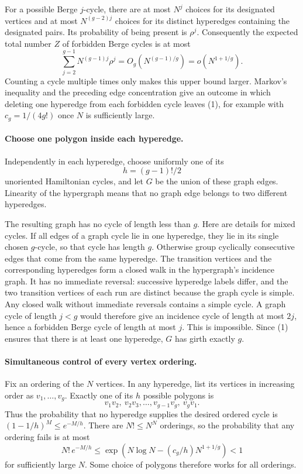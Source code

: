 For a possible Berge \(j\)-cycle, there are at most \(N^j\) choices for its designated vertices and at most \(N^{(g-2)j}\) choices for its distinct hyperedges containing the designated pairs. Its probability of being present is \(\rho^j\). Consequently the expected total number \(Z\) of forbidden Berge cycles is at most
\[
 \sum_{j=2}^{g-1}N^{(g-1)j}\rho^j
 =O_g(N^{(g-1)/g})=o(N^{1+1/g}).
\]
Counting a cycle multiple times only makes this upper bound larger. Markov's inequality and the preceding edge concentration give an outcome in which deleting one hyperedge from each forbidden cycle leaves (1), for example with \(c_g=1/(4g!)\) once \(N\) is sufficiently large.

\paragraph{Choose one polygon inside each hyperedge.}
Independently in each hyperedge, choose uniformly one of its
\[
 h=(g-1)!/2
\]
unoriented Hamiltonian cycles, and let \(G\) be the union of these graph edges. Linearity of the hypergraph means that no graph edge belongs to two different hyperedges.

The resulting graph has no cycle of length less than \(g\). Here are details for mixed cycles. If all edges of a graph cycle lie in one hyperedge, they lie in its single chosen \(g\)-cycle, so that cycle has length \(g\). Otherwise group cyclically consecutive edges that come from the same hyperedge. The transition vertices and the corresponding hyperedges form a closed walk in the hypergraph's incidence graph. It has no immediate reversal: successive hyperedge labels differ, and the two transition vertices of each run are distinct because the graph cycle is simple. Any closed walk without immediate reversals contains a simple cycle. A graph cycle of length \(j<g\) would therefore give an incidence cycle of length at most \(2j\), hence a forbidden Berge cycle of length at most \(j\). This is impossible. Since (1) ensures that there is at least one hyperedge, \(G\) has girth exactly \(g\).

\paragraph{Simultaneous control of every vertex ordering.}
Fix an ordering of the \(N\) vertices. In any hyperedge, list its vertices in increasing order as \(v_1,\ldots,v_g\). Exactly one of its \(h\) possible polygons is
\[
 v_1v_2,\ v_2v_3,\ldots,v_{g-1}v_g,\ v_gv_1.
\]
Thus the probability that no hyperedge supplies the desired ordered cycle is
\((1-1/h)^M\leq e^{-M/h}\). There are \(N!\leq N^N\) orderings, so the probability that any ordering fails is at most
\[
 N!\,e^{-M/h}\leq
 \exp\!\left(N\log N-(c_g/h)N^{1+1/g}\right)<1
\]
for sufficiently large \(N\). Some choice of polygons therefore works for all orderings.

